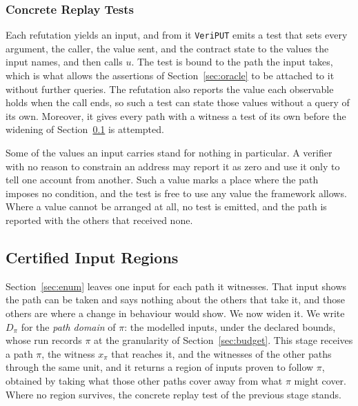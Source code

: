 \documentclass[manuscript,anonymous]{acmart}
\newcommand{\tool}[1]{\texttt{#1}}
\begin{document}
\subsubsection{Concrete Replay Tests}
Each refutation yields an input, and from it \tool{VeriPUT} emits a test that
sets every argument, the caller, the value sent, and the contract state to the
values the input names, and then calls $u$. The test is bound to the path the
input takes, which is what allows the assertions of Section~\ref{sec:oracle} to
be attached to it without further queries. The refutation also reports the value
each observable holds when the call ends, so such a test can state those values
without a query of its own. Moreover, it gives every path with a
witness a test of its own before the widening of Section~\ref{sec:region} is
attempted.

Some of the values an input carries stand for nothing in particular. A verifier
with no reason to constrain an address may report it as zero and use it only to
tell one account from another. Such a value marks a place where the path imposes
no condition, and the test is free to use any value the framework allows. Where
a value cannot be arranged at all, no test is emitted, and the path is reported
with the others that received none.

\subsection{Certified Input Regions}\label{sec:region}

Section~\ref{sec:enum} leaves one input for each path it witnesses. That input
shows the path can be taken and says nothing about the others that take it, and
those others are where a change in behaviour would show. We now widen it. We
write $D_\pi$ for the \emph{path domain} of $\pi$: the modelled inputs, under
the declared bounds, whose run records $\pi$ at the granularity of
Section~\ref{sec:budget}. This stage receives a path $\pi$, the witness $x_\pi$
that reaches it, and the witnesses of the other paths through the same unit,
and it returns a region of inputs proven to follow $\pi$, obtained by taking
what those other paths cover away from what $\pi$ might cover. Where no region
survives, the concrete replay test of the previous stage stands.
\end{document}

